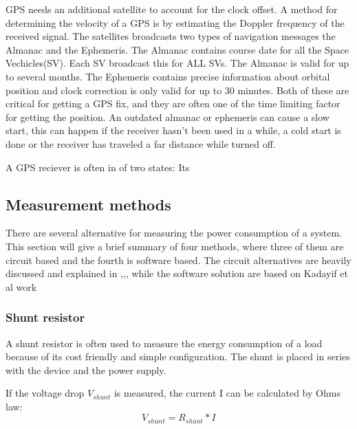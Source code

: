   GPS needs an additional satellite to account for the clock offset. A method for determining the velocity of a GPS is by estimating the Doppler frequency of the received signal. The satellites broadcasts two types of navigation messages the Almanac and the Ephemeris. The Almanac contains course date for all the Space Vechicles(SV). Each SV broadcast this for ALL SVs. The Almanac is valid for up to several months. The Ephemeris contains precise information about orbital position and clock correction is only valid for up to 30 minutes. Both of these are critical for getting a GPS fix, and they are often one of the time limiting factor for getting the position. 
  An outdated almanac or ephemeris can cause a slow start, this can happen if the receiver hasn't been used in a while, a cold start is done or the receiver has traveled a far distance while turned off.
  
  A GPS reciever is often in of two states: Its

\subsection{Measurement methods}

There are several alternative for measuring the power consumption of a system. This section will give a brief summary of four methods, where three of them are circuit based and the fourth is software based. The circuit alternatives are heavily discussed and explained in \cite{Intersil},\cite{Infineon},\cite{Vishay}, while the software solution are based on Kadayif et al work 

\subsubsection{Shunt resistor}
A shunt resistor is often used to measure the energy consumption of a load because of its cost friendly and simple configuration. The shunt is placed in series with the device and the power supply.

If the voltage drop $V_{shunt}$ is measured, the current I can be calculated by Ohms law:\begin{equation}
V_{shunt}=R_{shunt}*I
\end{equation}

